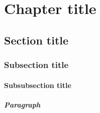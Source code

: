 \chapter{Chapter title}

\section{Section title}
\lipsum
\cite[report]{template}

\subsection{Subsection title}
\lipsum
\cite[p. 42]{template}

\subsubsection{Subsubsection title}
\lipsum
\cite{template}

\paragraph{Paragraph}
\lipsum
